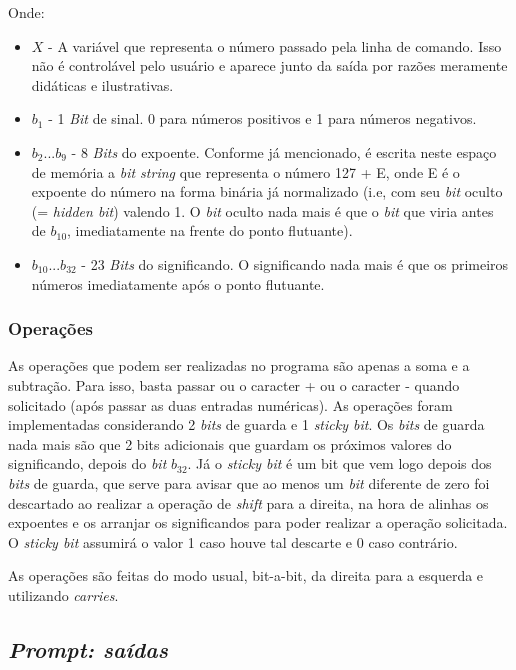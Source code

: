 \documentclass[11pt]{article}
\begin{document}
Onde:
\begin{itemize}
  \item $ X $ - A variável que representa o número passado pela linha de comando. Isso não é controlável pelo usuário e aparece junto da saída por razões meramente didáticas e ilustrativas.
  \item $ b_1 $ - 1 \textit{Bit} de sinal. 0 para números positivos e 1 para números negativos.
  \item $ b_2 ... b_9 $ - 8 \textit{Bits} do expoente. Conforme já mencionado, é escrita neste espaço de memória a \textit{bit string} que representa o número 127 + E, onde E é o expoente
  do número na forma binária já normalizado (i.e, com seu \textit{bit} oculto (= \textit{hidden bit}) valendo 1. O \textit{bit} oculto nada mais é que o \textit{bit} que viria antes de $ b_10 $, imediatamente na frente
  do ponto flutuante).
  \item $ b_{10} ... b_{32} $ - 23 \textit{Bits} do significando. O significando nada mais é que os primeiros números imediatamente após o ponto flutuante.
\end{itemize}

\subsubsection{Operações}

\indent\indent As operações que podem ser realizadas no programa são apenas a soma e a subtração. Para isso, basta passar ou o caracter + ou o caracter - quando solicitado (após passar as
duas entradas numéricas). As operações foram implementadas considerando 2 \textit{bits} de guarda e 1 \textit{sticky bit}. Os \textit{bits} de guarda nada mais são que 2 bits adicionais que guardam
os próximos valores do significando, depois do \textit{bit} $ b_{32} $. Já o \textit{sticky bit} é um bit que vem logo depois dos \textit{bits} de guarda, que serve para avisar que ao menos um \textit{bit}
diferente de zero foi descartado ao realizar a operação de \textit{shift} para a direita, na hora de alinhas os expoentes e os arranjar os significandos para poder realizar a operação solicitada. O
\textit{sticky bit} assumirá o valor 1 caso houve tal descarte e 0 caso contrário.

As operações são feitas do modo usual, bit-a-bit, da direita para a esquerda e utilizando \textit{carries}.

\subsection{\textit{Prompt: saídas}}
\end{document}
